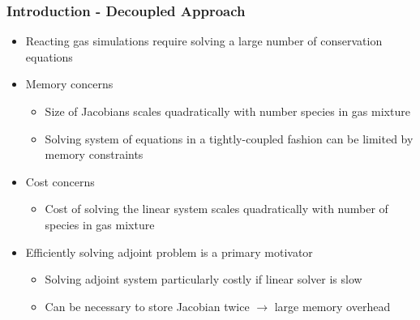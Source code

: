 \documentclass{beamer}
\begin{document}
\begin{frame}
  \frametitle{Introduction - Decoupled Approach}
  \begin{itemize}
    \item Reacting gas simulations require solving a large number of conservation
      equations
    \item Memory concerns
    \begin{itemize}
        \item Size of Jacobians scales quadratically with number species in gas mixture
        \item Solving system of equations in a tightly-coupled fashion can be
          limited by memory constraints
    \end{itemize}
    \item Cost concerns
    \begin{itemize}
      \item Cost of solving the linear system scales quadratically with number
      of species in gas mixture
    \end{itemize}
    \item Efficiently solving adjoint problem is a primary motivator
      \begin{itemize}
        \item Solving adjoint system particularly costly if linear solver is
          slow
        \item Can be necessary to store Jacobian twice $\to$ large memory
          overhead
      \end{itemize}
  \end{itemize}
\end{frame}
\end{document}
